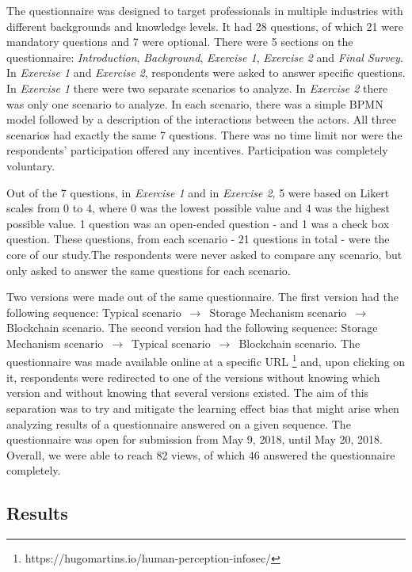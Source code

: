 The questionnaire was designed to target professionals in multiple industries with different backgrounds and knowledge levels. It had 28 questions, of which 21 were mandatory questions and 7 were optional. There were 5 sections on the questionnaire: \textit{Introduction}, \textit{Background}, \textit{Exercise 1}, \textit{Exercise 2} and \textit{Final Survey}. In \textit{Exercise 1} and \textit{Exercise 2}, respondents were asked to answer specific questions. In \textit{Exercise 1} there were two separate scenarios to analyze. In \textit{Exercise 2} there was only one scenario to analyze. In each scenario, there was a simple BPMN \cite{BPMN} model followed by a description of the interactions between the actors. All three scenarios had exactly the same 7 questions. There was no time limit nor were the respondents' participation offered any incentives. Participation was completely voluntary. 

Out of the 7 questions, in \textit{Exercise 1} and in \textit{Exercise 2}, 5 were based on Likert scales from 0 to 4, where 0 was the lowest possible value and 4 was the highest possible value. 1 question was an open-ended question - and 1 was a check box question. These questions, from each scenario - 21 questions in total - were the core of our study.The respondents were never asked to compare any scenario, but only asked to answer the same questions for each scenario.

Two versions were made out of the same questionnaire. The first version had the following sequence: Typical scenario $\,\to\,$ Storage Mechanism scenario $\,\to\,$ Blockchain scenario. The second version had the following sequence: Storage Mechanism scenario $\,\to\,$ Typical scenario $\,\to\,$ Blockchain scenario. The questionnaire was made available online at a specific URL \footnote{https://hugomartins.io/human-perception-infosec/} and, upon clicking on it, respondents were redirected to one of the versions without knowing which version and without knowing that several versions existed. The aim of this separation was to try and mitigate the learning effect bias that might arise when analyzing results of a questionnaire answered on a given sequence. The questionnaire was open for submission from May 9, 2018, until May 20, 2018. Overall, we were able to reach 82 views, of which 46 answered the questionnaire completely. 

\subsection{Results}

